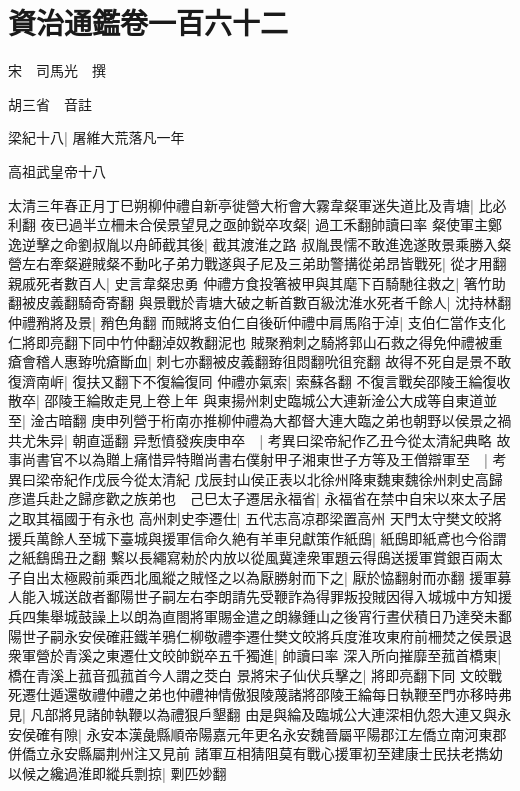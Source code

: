 \section{資治通鑑卷一百六十二}
宋　司馬光　撰

胡三省　音註

梁紀十八|{
	屠維大荒落凡一年}


高祖武皇帝十八

太清三年春正月丁巳朔柳仲禮自新亭徙營大桁會大霧韋粲軍迷失道比及青塘|{
	比必利翻}
夜已過半立柵未合侯景望見之亟帥鋭卒攻粲|{
	過工禾翻帥讀曰率}
粲使軍主鄭逸逆擊之命劉叔胤以舟師截其後|{
	截其渡淮之路}
叔胤畏懦不敢進逸遂敗景乘勝入粲營左右牽粲避賊粲不動叱子弟力戰遂與子尼及三弟助警搆從弟昂皆戰死|{
	從才用翻}
親戚死者數百人|{
	史言韋粲忠勇}
仲禮方食投箸被甲與其麾下百騎馳往救之|{
	箸竹助翻被皮義翻騎奇寄翻}
與景戰於青塘大破之斬首數百級沈淮水死者千餘人|{
	沈持林翻}
仲禮矟將及景|{
	矟色角翻}
而賊將支伯仁自後斫仲禮中肩馬陷于淖|{
	支伯仁當作支化仁將即亮翻下同中竹仲翻淖奴教翻泥也}
賊聚矟刺之騎將郭山石救之得免仲禮被重瘡會稽人惠臶吮瘡斷血|{
	刺七亦翻被皮義翻臶徂悶翻吮徂兖翻}
故得不死自是景不敢復濟南㟁|{
	復扶又翻下不復綸復同}
仲禮亦氣索|{
	索蘇各翻}
不復言戰矣邵陵王綸復收散卒|{
	邵陵王綸敗走見上卷上年}
與東揚州刺史臨城公大連新淦公大成等自東道並至|{
	淦古暗翻}
庚申列營于桁南亦推柳仲禮為大都督大連大臨之弟也朝野以侯景之禍共尤朱异|{
	朝直遥翻}
异慙憤發疾庚申卒　|{
	考異曰梁帝紀作乙丑今從太清紀典略}
故事尚書官不以為贈上痛惜异特贈尚書右僕射甲子湘東世子方等及王僧辯軍至　|{
	考異曰梁帝紀作戊辰今從太清紀}
戊辰封山侯正表以北徐州降東魏東魏徐州刺史高歸彦遣兵赴之歸彦歡之族弟也　己巳太子遷居永福省|{
	永福省在禁中自宋以來太子居之取其福國于有永也}
高州刺史李遷仕|{
	五代志高凉郡梁置高州}
天門太守樊文皎將援兵萬餘人至城下臺城與援軍信命久絶有羊車兒獻策作紙䲭|{
	紙䲭即紙鳶也今俗謂之紙鷂䲭丑之翻}
繫以長繩寫勑於内放以從風冀達衆軍題云得䲭送援軍賞銀百兩太子自出太極殿前乘西北風縱之賊怪之以為厭勝射而下之|{
	厭於恊翻射而亦翻}
援軍募人能入城送啟者鄱陽世子嗣左右李朗請先受鞭詐為得罪叛投賊因得入城城中方知援兵四集舉城鼓譟上以朗為直閤將軍賜金遣之朗緣鍾山之後宵行晝伏積日乃達癸未鄱陽世子嗣永安侯確莊鐵羊鴉仁柳敬禮李遷仕樊文皎將兵度淮攻東府前柵焚之侯景退衆軍營於青溪之東遷仕文皎帥鋭卒五千獨進|{
	帥讀曰率}
深入所向摧靡至菰首橋東|{
	橋在青溪上菰音孤菰首今人謂之茭白}
景將宋子仙伏兵擊之|{
	將即亮翻下同}
文皎戰死遷仕遁還敬禮仲禮之弟也仲禮神情傲狠陵蔑諸將邵陵王綸每日執鞭至門亦移時弗見|{
	凡部將見諸帥執鞭以為禮狠戶墾翻}
由是與綸及臨城公大連深相仇怨大連又與永安侯確有隙|{
	永安本漢彘縣順帝陽嘉元年更名永安魏晉屬平陽郡江左僑立南河東郡併僑立永安縣屬荆州注又見前}
諸軍互相猜阻莫有戰心援軍初至建康士民扶老擕幼以候之纔過淮即縱兵剽掠|{
	㔄匹妙翻}
